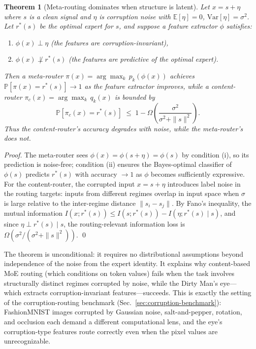 \documentclass[11pt,a4paper]{article}
\newtheorem{theorem}{Theorem}
\begin{document}
\begin{theorem}[Meta-routing dominates when structure is latent]
\label{thm:meta-routing}
Let $x = s + \eta$ where $s$ is a clean signal and $\eta$ is corruption noise
with $\mathbb{E}[\eta]=0$, $\mathrm{Var}[\eta]=\sigma^2$. Let $r^\ast(s)$ be the
optimal expert for $s$, and suppose a feature extractor $\phi$ satisfies:
\begin{enumerate}
  \item $\phi(x) \perp \eta$ (the features are corruption-invariant),
  \item $\phi(x) \not\perp r^\ast(s)$ (the features are predictive of the
        optimal expert).
\end{enumerate}
Then a meta-router $\pi(x)=\arg\max_k\, p_k(\phi(x))$ achieves
$\mathbb{P}[\pi(x) = r^\ast(s)] \to 1$ as the feature extractor improves,
while a content-router $\pi_c(x) = \arg\max_k\, q_k(x)$ is bounded by
\[
  \mathbb{P}[\pi_c(x) = r^\ast(s)]
  \;\leq\; 1 - \Omega\!\left(\frac{\sigma^2}{\sigma^2 + \|s\|^2}\right).
\]
Thus the content-router's accuracy degrades with noise, while the
meta-router's does not.
\end{theorem}

\begin{proof}
The meta-router sees $\phi(x) = \phi(s + \eta) = \phi(s)$ by condition (i),
so its prediction is noise-free; condition (ii) ensures the Bayes-optimal
classifier of $\phi(s)$ predicts $r^\ast(s)$ with accuracy $\to 1$ as $\phi$
becomes sufficiently expressive. For the content-router, the corrupted input
$x = s + \eta$ introduces label noise in the routing targets: inputs from
different regimes overlap in input space when $\sigma$ is large relative to the
inter-regime distance $\|s_i - s_j\|$. By Fano's inequality, the mutual
information $I(x; r^\ast(s)) \leq I(s; r^\ast(s)) - I(\eta; r^\ast(s) \mid s)$,
and since $\eta \perp r^\ast(s) \mid s$, the routing-relevant information
loss is $\Omega(\sigma^2 / (\sigma^2 + \|s\|^2))$. \qed
\end{proof}

The theorem is unconditional: it requires no distributional assumptions
beyond independence of the noise from the expert identity. It explains why
content-based MoE routing (which conditions on token values) fails when the
task involves structurally distinct regimes corrupted by noise, while the
Dirty Man's eye---which extracts corruption-invariant features---succeeds.
This is exactly the setting of the corruption-routing benchmark
(Sec.~\ref{sec:corruption-benchmark}): FashionMNIST images corrupted by
Gaussian noise, salt-and-pepper, rotation, and occlusion each demand a
different computational lens, and the eye's corruption-type features route
correctly even when the pixel values are unrecognizable.
\end{document}
